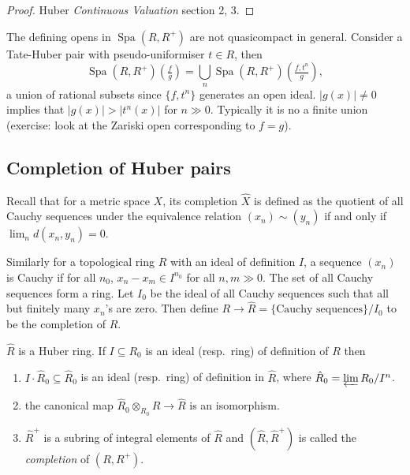 \documentclass[a4paper]{article}
\DeclareMathOperator{\Spa}{Spa}
\begin{document}
\begin{proof}
  Huber \emph{Continuous Valuation} section 2, 3.
\end{proof}

\begin{note}
  The defining opens in \(\Spa(R, R^+)\) are not quasicompact in general. Consider a Tate-Huber pair with pseudo-uniformiser \(t \in R\), then
  \[
    \Spa(R, R^+)(\tfrac{f}{g}) = \bigcup_n \Spa (R, R^+) (\tfrac{f, t^n}{g}),
  \]
  a union of rational subsets since \(\{f, t^n\}\) generates an open ideal. \(|g(x)| \ne 0\) implies that \(|g(x)| > |t^n(x)|\) for \(n \gg 0\). Typically it is no a finite union (exercise: look at the Zariski open corresponding to \(f = g\)).
\end{note}

\subsection{Completion of Huber pairs}

Recall that for a metric space \(X\), its completion \(\hat X\) is defined as the quotient of all Cauchy sequences under the equivalence relation \((x_n) \sim (y_n)\) if and only if \(\lim_n d(x_n, y_n) = 0\).

Similarly for a topological ring \(R\) with an ideal of definition \(I\), a sequence \((x_n)\) is Cauchy if for all \(n_0\), \(x_n - x_m \in I^{n_0}\) for all \(n, m \gg 0\). The set of all Cauchy sequences form a ring. Let \(I_0\) be the ideal of all Cauchy sequences such that all but finitely many \(x_n\)'s are zero. Then define \(R \to \hat R = \{\text{Cauchy sequences}\}/I_0\) to be the completion of \(R\).

\begin{proposition}
  \(\hat R\) is a Huber ring. If \(I \subseteq R_0\) is an ideal (resp.\ ring) of definition of \(R\) then
  \begin{enumerate}
  \item \(I \cdot \hat R_0 \subseteq \hat R_0\) is an ideal (resp.\ ring) of definition in \(\hat R\), where \(\hat R_0 = \varprojlim R_0/I^n\).
  \item the canonical map \(\hat R_0 \otimes_{R_0} R \to \hat R\) is an isomorphism.
  \item \(\hat R^+\) is a subring of integral elements of \(\hat R\) and \((\hat R, \hat R^+)\) is called the \emph{completion} of \((R, R^+)\).
  \end{enumerate}
\end{proposition}
\end{document}

